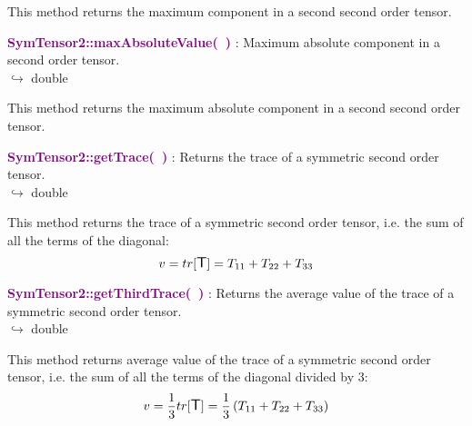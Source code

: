 This method returns the maximum component in a second second order tensor.

\textcolor{purple}{\textbf{SymTensor2::maxAbsoluteValue(~)}}\label{SymTensor2::maxAbsoluteValue()} : Maximum absolute component in a second order tensor.\\ \hspace*{5mm}$\hookrightarrow$ double

This method returns the maximum absolute component in a second second order tensor.

\textcolor{purple}{\textbf{SymTensor2::getTrace(~)}}\label{SymTensor2::getTrace()} : Returns the trace of a symmetric second order tensor.\\ \hspace*{5mm}$\hookrightarrow$ double

  This method returns the trace of a symmetric second order tensor, i.e. the sum of all the terms of the diagonal:
\begin{equation*}
v = tr[\mbox{\large\ensuremath{\mathsf{T}}}] = T_{11}+T_{22}+T_{33}
\end{equation*}

\textcolor{purple}{\textbf{SymTensor2::getThirdTrace(~)}}\label{SymTensor2::getThirdTrace()} : Returns the average value of the trace of a symmetric second order tensor.\\ \hspace*{5mm}$\hookrightarrow$ double

This method returns average value of the trace of a symmetric second order tensor, i.e. the sum of all the terms of the diagonal divided by 3:
\begin{equation*}
v = \frac{1}{3} tr[\mbox{\large\ensuremath{\mathsf{T}}}] =  \frac{1}{3} \left( T_{11}+T_{22}+T_{33} \right)
\end{equation*}

